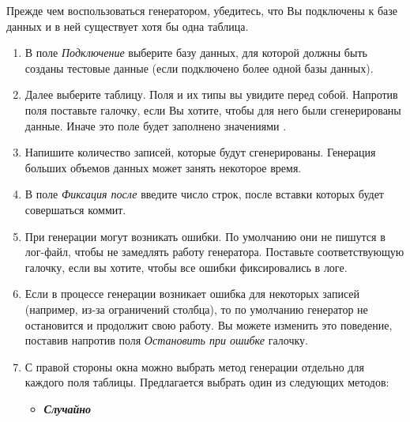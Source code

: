 Прежде чем воспользоваться генератором, убедитесь, что Вы подключены к базе данных и в ней существует хотя бы одна таблица.  

\begin{enumerate}[leftmargin=39pt]
	\item В поле \textit{Подключение} выберите базу данных, для которой должны быть созданы тестовые данные (если подключено более одной базы данных). 

	\item Далее выберите таблицу. Поля и их типы вы увидите перед собой. Напротив поля поставьте галочку, если Вы хотите, чтобы для него были сгенерированы данные. Иначе это поле будет заполнено значениями .

	\item Напишите количество записей, которые будут сгенерированы. Генерация больших объемов данных может занять некоторое время. 
	
	\item В поле \textit{Фиксация после} введите число строк, после вставки которых будет совершаться коммит.
	
	\item При генерации могут возникать ошибки. По умолчанию они не пишутся в лог-файл, чтобы не замедлять работу генератора. Поставьте соответствующую галочку, если вы хотите, чтобы все ошибки фиксировались в логе.
	
	\item Если в процессе генерации возникает ошибка для некоторых записей (например, из-за ограничений столбца), то по умолчанию генератор не остановится и продолжит свою работу. Вы можете изменить это поведение, поставив напротив поля \textit{Остановить при ошибке} галочку.

	\item С правой стороны окна можно выбрать метод генерации отдельно для каждого поля таблицы. 
Предлагается выбрать один из следующих методов:
\begin{itemize}[leftmargin=10pt]
	\item \textbf{\textit{Случайно}}
	

\end{itemize}
\end{enumerate}
